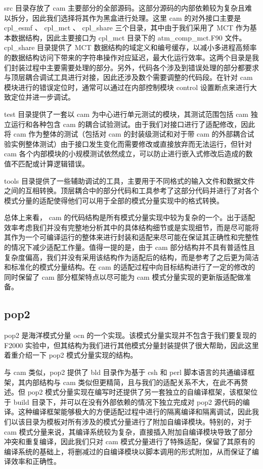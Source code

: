 src 目录存放了 cam 主要部分的全部源码。这部分源码的内部依赖较为复杂且难以拆分，因此我们选择将其作为黑盒进行处理。这里 cam 的对外接口主要是 cpl\_esmf 、 cpl\_mct 、 cpl\_share 三个目录，其中由于我们采用了 MCT 作为基本数据结构，因此主要接口为 cpl\_mct 目录下的 atm\_comp\_mct.F90 文件。 cpl\_share 目录提供了 MCT 数据结构的域定义和编号缓存，以减小多进程高频率的数据结构访问下带来的字符串操作对应延迟，最大化运行效率。这两个目录是我们封装过程中主要需要处理的部分。另外，代码各个涉及到错误处理的部分都要求与顶层耦合调试工具进行对接，因此还涉及数个需要调整的代码段。在针对 cam 模块进行的错误定位时，通常可以通过在内部控制模块 control 设置断点来进行大致定位并进一步调试。

test 目录提供了一套以 cam 为中心进行单元测试的模块，其测试范围包括 cam 独立运行和各种包含 cam 的耦合试验测试。由于我们对接口进行了适配修改，因此将 cam 作为整体的测试（包括对 cam 的封装级测试和对于带 cam 的外部耦合试验实例整体测试）由于接口发生变化而需要修改或直接放弃而无法运行，但针对 cam 各个内部模块的小规模测试依然成立，可以防止进行嵌入式修改后造成的数值不匹配或计算逻辑错误。

tools 目录提供了一些辅助调试的工具，主要用于不同格式的输入文件和数据文件之间的互相转换。顶层耦合中的部分代码和工具参考了这部分代码并进行了对各个模式分量的适配使得他们可以用于全部的模式分量实现中的格式转换。

总体上来看， cam 的代码结构是所有模式分量实现中较为复杂的一个。出于适配效率考虑我们并没有完整地分析其中的具体结构细节或是实现细节，而是尽可能将其作为一个可编译运行的整体来进行封装和适配来尽可能在保证其正确性和完整性的情况下减少适配工作量。值得一提的是，由于 cam 部分结构并不具有普适性且复杂度偏高，我们并没有采用该结构作为适配后的结构，而是参考了之后更为简洁和标准化的模式分量结构。在 cam 的适配过程中向目标结构进行了一定的修改的同时保留了 cam 部分框架特点以尽可能为 cam 模式分量实现的更新版适配做准备。

\subsection{pop2}

pop2 是海洋模式分量 ocn 的一个实现。该模式分量实现并不包含于我们要复现的 F2000 实验中，但其结构为我们进行其他模式分量封装提供了很大帮助，因此这里着重介绍一下 pop2 模式分量实现的结构。

与 cam 类似，pop2 提供了 bld 目录作为基于 csh 和 perl 脚本语言的共通编译框架，其内部结构与 cam 类似但更精简，且与我们的适配关系不大，在此不再赘述。但 pop2 模式分量实现在编写时还提供了另一套独立的自编译框架，该框架位于 build 目录下，并可以在没有外部依赖的情况下独立完成对 pop2 源代码的编译。这种编译框架能够极大的方便适配过程中进行的隔离编译和隔离调试，因此我们以该目录为模板对所有涉及的模式分量进行了附加自编译模块。特别的，对于 cam 模式分量来说，其编译系统较为复杂，直接插入附加自编译模块导致了部分冲突和重复编译，因此我们只对 cam 模式分量进行了特殊适配，保留了其原有的编译系统的基础上，将删减过的自编译模块以脚本调用的形式附加，从而保证了编译效率和正确性。

